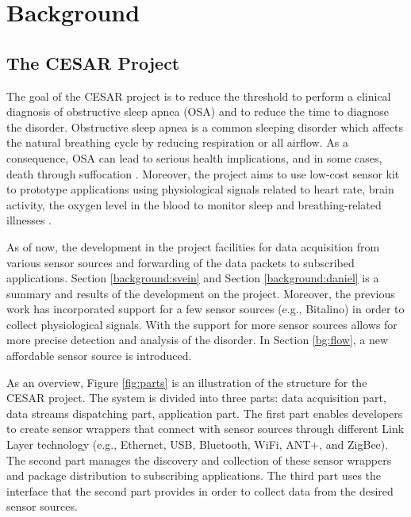 \chapter{Background}

\section{The CESAR Project}
The goal of the CESAR project is to reduce the threshold to perform a clinical diagnosis of obstructive sleep apnea (OSA) and to reduce the time to diagnose the disorder. Obstructive sleep apnea is a common sleeping disorder which affects the natural breathing cycle by reducing respiration or all airflow. As a consequence, OSA can lead to serious health implications, and in some cases, death through suffocation \cite{cesarinfo}.  Moreover, the project aims to use low-cost sensor kit to prototype applications using physiological signals related to heart rate, brain activity, the oxygen level in the blood to monitor sleep and breathing-related illnesses \cite{cesar}.

As of now, the development in the project facilities for data acquisition from various sensor sources and forwarding of the data packets to subscribed applications. Section \ref{background:svein} and Section \ref{background:daniel} is a summary and results of the development on the project. Moreover, the previous work has incorporated support for a few sensor sources (e.g., Bitalino) in order to collect physiological signals. With the support for more sensor sources allows for more precise detection and analysis of the disorder. In Section \ref{bg:flow}, a new affordable sensor source is introduced.

As an overview, Figure \ref{fig:parts} is an illustration of the structure for the CESAR project. The system is divided into three parts: data acquisition part, data streams dispatching part, application part. The first part enables developers to create sensor wrappers that connect with sensor sources through different Link Layer technology (e.g., Ethernet, USB, Bluetooth, WiFi, ANT+, and ZigBee). The second part manages the discovery and collection of these sensor wrappers and package distribution to subscribing applications. The third part uses the interface that the second part provides in order to collect data from the desired sensor sources.

